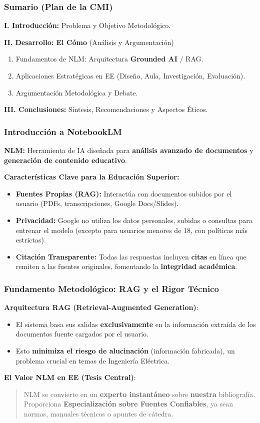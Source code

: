 \documentclass[aspectratio=43]{beamer}
\begin{document}
\begin{frame}
\frametitle{Sumario (Plan de la CMI)}

\textbf{I. Introducción:} Problema y Objetivo Metodológico.

\textbf{II. Desarrollo: El Cómo} (Análisis y Argumentación)
\begin{enumerate}
    \item Fundamentos de NLM: Arquitectura \textbf{Grounded AI} / RAG.
    \item Aplicaciones Estratégicas en EE (Diseño, Aula, Investigación, Evaluación).
    \item Argumentación Metodológica y Debate.
\end{enumerate}

\textbf{III. Conclusiones:} Síntesis, Recomendaciones y Aspectos Éticos.
\end{frame}

\begin{frame}
\frametitle{Introducción a NotebookLM}

\textbf{NLM:} Herramienta de IA diseñada para \textbf{análisis avanzado de documentos} y \textbf{generación de contenido educativo}.

\vfill
\textbf{Características Clave para la Educación Superior:}
\begin{itemize}
    \item \textbf{Fuentes Propias (RAG):} Interactúa con documentos subidos por el usuario (PDFs, transcripciones, Google Docs/Slides).
    \item \textbf{Privacidad:} Google no utiliza los datos personales, subidas o consultas para entrenar el modelo (excepto para usuarios menores de 18, con políticas más estrictas).
    \item \textbf{Citación Transparente:} Todas las respuestas incluyen \textbf{citas} en línea que remiten a las fuentes originales, fomentando la \textbf{integridad académica}.
\end{itemize}
\end{frame}

\begin{frame}
\frametitle{Fundamento Metodológico: RAG y el Rigor Técnico}

\textbf{Arquitectura RAG (Retrieval-Augmented Generation)}:
\begin{itemize}
    \item El sistema basa sus salidas \textbf{exclusivamente} en la información extraída de los documentos fuente cargados por el usuario.
    \item Esto \textbf{minimiza el riesgo de alucinación} (información fabricada), un problema crucial en temas de Ingeniería Eléctrica.
\end{itemize}
\vfill
\textbf{El Valor NLM en EE (Tesis Central)}:
\begin{quote}
NLM se convierte en un \textbf{experto instantáneo} sobre \textbf{nuestra} bibliografía. Proporciona \textbf{Especialización sobre Fuentes Confiables}, ya sean normas, manuales técnicos o apuntes de cátedra.
\end{quote}
\end{frame}
\end{document}
